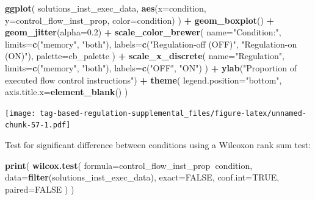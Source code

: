 \documentclass[]{book}
\newenvironment{Shaded}{\begin{snugshade}}{\end{snugshade}}
\newcommand{\DataTypeTok}[1]{\textcolor[rgb]{0.13,0.29,0.53}{#1}}
\newcommand{\FloatTok}[1]{\textcolor[rgb]{0.00,0.00,0.81}{#1}}
\newcommand{\KeywordTok}[1]{\textcolor[rgb]{0.13,0.29,0.53}{\textbf{#1}}}
\newcommand{\NormalTok}[1]{#1}
\newcommand{\OperatorTok}[1]{\textcolor[rgb]{0.81,0.36,0.00}{\textbf{#1}}}
\newcommand{\OtherTok}[1]{\textcolor[rgb]{0.56,0.35,0.01}{#1}}
\newcommand{\StringTok}[1]{\textcolor[rgb]{0.31,0.60,0.02}{#1}}
\begin{document}
\begin{Shaded}
\begin{Highlighting}[]
\KeywordTok{ggplot}\NormalTok{( solutions_inst_exec_data, }\KeywordTok{aes}\NormalTok{(}\DataTypeTok{x=}\NormalTok{condition, }\DataTypeTok{y=}\NormalTok{control_flow_inst_prop, }\DataTypeTok{color=}\NormalTok{condition) ) }\OperatorTok{+}
\StringTok{  }\KeywordTok{geom_boxplot}\NormalTok{() }\OperatorTok{+}
\StringTok{  }\KeywordTok{geom_jitter}\NormalTok{(}\DataTypeTok{alpha=}\FloatTok{0.2}\NormalTok{) }\OperatorTok{+}
\StringTok{  }\KeywordTok{scale_color_brewer}\NormalTok{(}
    \DataTypeTok{name=}\StringTok{"Condition:"}\NormalTok{,}
    \DataTypeTok{limits=}\KeywordTok{c}\NormalTok{(}\StringTok{"memory"}\NormalTok{, }\StringTok{"both"}\NormalTok{),}
    \DataTypeTok{labels=}\KeywordTok{c}\NormalTok{(}\StringTok{"Regulation-off (OFF)"}\NormalTok{, }\StringTok{"Regulation-on (ON)"}\NormalTok{),}
    \DataTypeTok{palette=}\NormalTok{cb_palette}
\NormalTok{  ) }\OperatorTok{+}
\StringTok{  }\KeywordTok{scale_x_discrete}\NormalTok{(}
    \DataTypeTok{name=}\StringTok{"Regulation"}\NormalTok{,}
    \DataTypeTok{limits=}\KeywordTok{c}\NormalTok{(}\StringTok{"memory"}\NormalTok{, }\StringTok{"both"}\NormalTok{),}
    \DataTypeTok{labels=}\KeywordTok{c}\NormalTok{(}\StringTok{"OFF"}\NormalTok{, }\StringTok{"ON"}\NormalTok{)}
\NormalTok{  ) }\OperatorTok{+}
\StringTok{  }\KeywordTok{ylab}\NormalTok{(}\StringTok{"Proportion of executed flow control instructions"}\NormalTok{) }\OperatorTok{+}
\StringTok{  }\KeywordTok{theme}\NormalTok{(}
    \DataTypeTok{legend.position=}\StringTok{"bottom"}\NormalTok{,}
    \DataTypeTok{axis.title.x=}\KeywordTok{element_blank}\NormalTok{()}
\NormalTok{  )}
\end{Highlighting}
\end{Shaded}

\texttt{[image: tag-based-regulation-supplemental\_files/figure-latex/unnamed-chunk-57-1.pdf]}

Test for significant difference between conditions using a Wilcoxon rank sum test:

\begin{Shaded}
\begin{Highlighting}[]
\KeywordTok{print}\NormalTok{(}
  \KeywordTok{wilcox.test}\NormalTok{(}
    \DataTypeTok{formula=}\NormalTok{control_flow_inst_prop}\OperatorTok{~}\NormalTok{condition,}
    \DataTypeTok{data=}\KeywordTok{filter}\NormalTok{(solutions_inst_exec_data),}
    \DataTypeTok{exact=}\OtherTok{FALSE}\NormalTok{,}
    \DataTypeTok{conf.int=}\OtherTok{TRUE}\NormalTok{,}
    \DataTypeTok{paired=}\OtherTok{FALSE}
\NormalTok{  )}
\NormalTok{)}
\end{Highlighting}
\end{Shaded}
\end{document}
